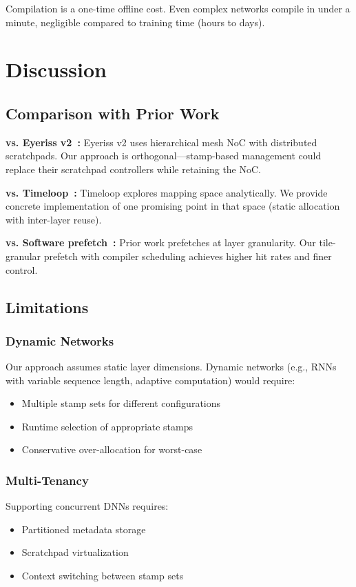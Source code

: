\documentclass[journal]{IEEEtran}
\begin{document}
Compilation is a one-time offline cost. Even complex networks compile in under a minute, negligible compared to training time (hours to days).

\section{Discussion}

\subsection{Comparison with Prior Work}

\textbf{vs. Eyeriss v2~\cite{chen2019eyerissv2}:} Eyeriss v2 uses hierarchical mesh NoC with distributed scratchpads. Our approach is orthogonal—stamp-based management could replace their scratchpad controllers while retaining the NoC.

\textbf{vs. Timeloop~\cite{parashar2019timeloop}:} Timeloop explores mapping space analytically. We provide concrete implementation of one promising point in that space (static allocation with inter-layer reuse).

\textbf{vs. Software prefetch~\cite{chen2016eyeriss}:} Prior work prefetches at layer granularity. Our tile-granular prefetch with compiler scheduling achieves higher hit rates and finer control.

\subsection{Limitations}

\subsubsection{Dynamic Networks}
Our approach assumes static layer dimensions. Dynamic networks (e.g., RNNs with variable sequence length, adaptive computation) would require:
\begin{itemize}
\item Multiple stamp sets for different configurations
\item Runtime selection of appropriate stamps
\item Conservative over-allocation for worst-case
\end{itemize}

\subsubsection{Multi-Tenancy}
Supporting concurrent DNNs requires:
\begin{itemize}
\item Partitioned metadata storage
\item Scratchpad virtualization
\item Context switching between stamp sets
\end{itemize}
\end{document}
